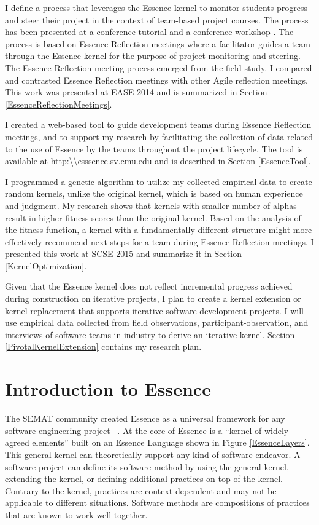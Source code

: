 \documentclass[preprint,12pt,3p]{elsarticle}
\begin{document}
I define a process that leverages the Essence kernel to monitor students progress and steer their project in the context of team-based project courses. The process has been presented at a conference tutorial \cite{SCSE2015Tutorial} and a conference workshop \cite{CSEET2015Workshop}. The process is based on Essence Reflection meetings where a facilitator guides a team through the Essence kernel for the purpose of project monitoring and steering. The Essence Reflection meeting process emerged from the field study. I compared and contrasted Essence Reflection meetings with other Agile reflection meetings. This work was presented at EASE 2014 \cite{EASE2014} and is summarized in Section \ref{EssenceReflectionMeetings}.

I created a web-based tool to guide development teams during Essence Reflection meetings, and to support my research by facilitating the collection of data related to the use of Essence by the teams throughout the project lifecycle. The tool is available at \url{http:\\esssence.sv.cmu.edu} and is described in Section \ref{EssenceTool}.

I programmed a genetic algorithm to utilize my collected empirical data to create random kernels, unlike the original kernel, which is based on human experience and judgment. My research shows that kernels with smaller number of alphas result in higher fitness scores than the original kernel. Based on the analysis of the fitness function, a kernel with a fundamentally different structure might more effectively recommend next steps for a team during Essence Reflection meetings. I presented this work at SCSE 2015 and summarize it in Section \ref{KernelOptimization}.

Given that the Essence kernel does not reflect incremental progress achieved during construction on iterative projects, I plan to create a kernel extension or kernel replacement that supports iterative software development projects. I will use empirical data collected from field observations, participant-observation, and interviews of software teams in industry to derive an iterative kernel. Section \ref{PivotalKernelExtension} contains my research plan.

\section{Introduction to Essence}
\label{Method}

The SEMAT community created Essence as a universal framework for any software engineering project ~\cite{JacobsonQueue}. At the core of Essence is a ``kernel of widely-agreed elements'' built on an Essence Language shown in Figure \ref{EssenceLayers}. This general kernel can theoretically support any kind of software endeavor. A software project can define its software method by using the general kernel, extending the kernel, or defining additional practices on top of the kernel. Contrary to the kernel, practices are context dependent and may not be applicable to different situations. Software methods are compositions of practices that are known to work well together.
\end{document}
